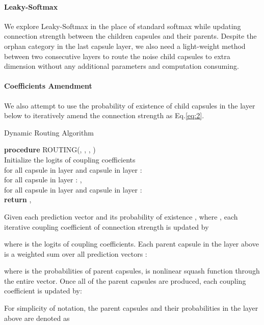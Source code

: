 \documentclass[11pt]{article}
\begin{document}
\paragraph{Leaky-Softmax} We explore Leaky-Softmax  in the place of standard softmax while updating connection strength between the children capsules and their parents. 
Despite the orphan category in the last capsule layer, we also need a light-weight method between two consecutive layers to route the noise child capsules to  extra dimension without any additional parameters and computation consuming.

\paragraph{Coefficients Amendment} 
We also attempt to use the probability of existence of child capsules in the layer below to iteratively amend the connection strength as Eq.\ref{eq:2}.


\begin{algorithm}
  \label{alg:1}
  \caption{Dynamic Routing Algorithm}
  \textbf{procedure} ROUTING(\textbf{}, , , )\\
        Initialize the logits of coupling coefficients  \\
	{
for all capsule  in layer  and capsule  in layer : 
\\
	    for all capsule  in layer : , \ \ \\
	    for all capsule  in layer  and capsule  in layer : \\
	}
  \textbf{return} ,\\
\end{algorithm}



Given each prediction vector  and its probability of existence , where , each iterative coupling coefficient of connection strength  is updated by

where  is the logits of coupling coefficients. Each parent capsule  in the layer above is a weighted sum over all prediction vectors :

where  is the probabilities of parent capsules,  is nonlinear squash function  through the entire vector.  Once all of the parent capsules are produced, each coupling coefficient  is updated by:

For simplicity of notation, the parent capsules and their probabilities in the layer above are denoted as
\end{document}
